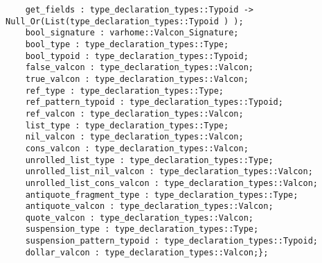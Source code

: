 \begin{verbatim}
    get_fields : type_declaration_types::Typoid -> Null_Or(List(type_declaration_types::Typoid ) );
    bool_signature : varhome::Valcon_Signature;
    bool_type : type_declaration_types::Type;
    bool_typoid : type_declaration_types::Typoid;
    false_valcon : type_declaration_types::Valcon;
    true_valcon : type_declaration_types::Valcon;
    ref_type : type_declaration_types::Type;
    ref_pattern_typoid : type_declaration_types::Typoid;
    ref_valcon : type_declaration_types::Valcon;
    list_type : type_declaration_types::Type;
    nil_valcon : type_declaration_types::Valcon;
    cons_valcon : type_declaration_types::Valcon;
    unrolled_list_type : type_declaration_types::Type;
    unrolled_list_nil_valcon : type_declaration_types::Valcon;
    unrolled_list_cons_valcon : type_declaration_types::Valcon;
    antiquote_fragment_type : type_declaration_types::Type;
    antiquote_valcon : type_declaration_types::Valcon;
    quote_valcon : type_declaration_types::Valcon;
    suspension_type : type_declaration_types::Type;
    suspension_pattern_typoid : type_declaration_types::Typoid;
    dollar_valcon : type_declaration_types::Valcon;};
\end{verbatim}
\index[fun]{-->}
